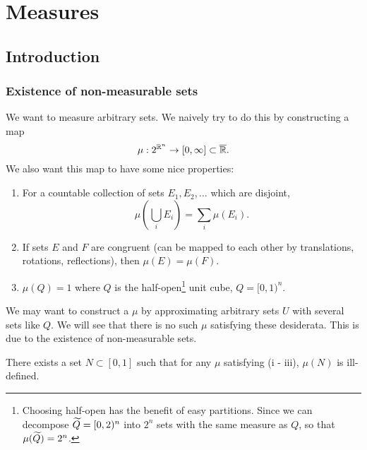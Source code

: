 \documentclass[12pt]{article} %
\begin{document}
\section{Measures}

\subsection{Introduction}

\subsubsection{Existence of non-measurable sets}

We want to measure arbitrary sets. We naively try to do this by constructing a map \[\mu : 2^{\mathbb{R}^n} \to [0, \infty] \subset \overline{\mathbb{R}}.\] We also want this map to have some nice properties: \begin{enumerate}
    \item For a countable collection of sets $E_1, E_2, \ldots$ which are disjoint, \[\mu\left( \bigcup_{i}E_i \right) = \sum_i \mu(E_i).\]
    \item If sets $E$ and $F$ are congruent (can be mapped to each other by translations, rotations, reflections), then $\mu(E) = \mu(F)$.
    \item $\mu(Q) = 1$ where $Q$ is the half-open\footnote{Choosing half-open has the benefit of easy partitions. Since we can decompose $\widetilde{Q} = [0,2)^n$ into $2^n$ sets with the same measure as $Q$, so that $\mu(\widetilde{Q}) = 2^n$.} unit cube, $Q = [0, 1)^n$.
\end{enumerate}

\noindent We may want to construct a $\mu$ by approximating arbitrary sets $U$ with several sets like $Q$. We will see that there is no such $\mu$ satisfying these desiderata. This is due to the existence of non-measurable sets.

\begin{lemma}
    There exists a set $N \subset [0,1]$ such that for any $\mu$ satisfying (i - iii), $\mu(N)$ is ill-defined.
\end{lemma}
\end{document}
